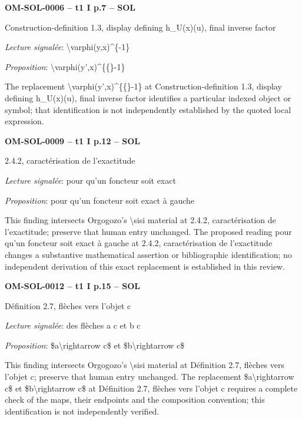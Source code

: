 \par\noindent\textbf{OM-SOL-0006 -- t1 I p.7 -- SOL}\par
Construction-definition 1.3, display defining h\_U(x)(u), final inverse factor\par
\emph{Lecture signalée}: \textbackslash{}varphi(y,x)\textasciicircum{}\{-1\}\par
\emph{Proposition}: \textbackslash{}varphi(y',x)\textasciicircum{}\{\{\}-1\}\par
The replacement \textbackslash{}varphi(y',x)\textasciicircum{}\{\{\}-1\} at Construction-definition 1.3, display defining h\_U(x)(u), final inverse factor identifies a particular indexed object or symbol; that identification is not independently established by the quoted local expression.\par
\par\noindent\textbf{OM-SOL-0009 -- t1 I p.12 -- SOL}\par
2.4.2, caractérisation de l’exactitude\par
\emph{Lecture signalée}: pour qu’un foncteur soit exact\par
\emph{Proposition}: pour qu'un foncteur soit exact à gauche\par
This finding intersects Orgogozo's \textbackslash{}sisi material at 2.4.2, caractérisation de l’exactitude; preserve that human entry unchanged. The proposed reading pour qu'un foncteur soit exact à gauche at 2.4.2, caractérisation de l’exactitude changes a substantive mathematical assertion or bibliographic identification; no independent derivation of this exact replacement is established in this review.\par
\par\noindent\textbf{OM-SOL-0012 -- t1 I p.15 -- SOL}\par
Définition 2.7, flèches vers l’objet c\par
\emph{Lecture signalée}: des flèches a c et b c\par
\emph{Proposition}: \$a\textbackslash{}rightarrow c\$ et \$b\textbackslash{}rightarrow c\$\par
This finding intersects Orgogozo's \textbackslash{}sisi material at Définition 2.7, flèches vers l’objet c; preserve that human entry unchanged. The replacement \$a\textbackslash{}rightarrow c\$ et \$b\textbackslash{}rightarrow c\$ at Définition 2.7, flèches vers l’objet c requires a complete check of the maps, their endpoints and the composition convention; this identification is not independently verified.\par
